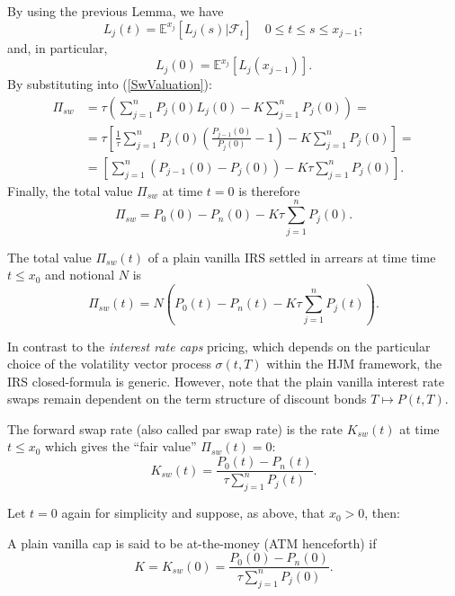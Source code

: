 By using the previous Lemma, we have 
$$
L_j(t)=\mathbb{E}^{x_j} \left[ L_j(s)\big| \mathcal{F}_t\right]\quad 0\leq
t\leq s\leq x_{j-1};
$$
and, in particular,
$$
L_j(0)=\mathbb{E}^{x_j} \left[ L_j(x_{j-1})\right].
$$
By substituting into (\ref{SwValuation}):
\begin{equation}
\label{SwValuationInter}
\begin{split}
\Pi_{sw} &=\tau \left(\sum_{j=1}^n P_j(0) L_j(0)-K\sum_{j=1}^n P_j(0)
\right)=\\ 
&=\tau \left[\frac{1}{\tau}\sum_{j=1}^n P_j(0)
  \left(\frac{P_{j-1}(0)}{P_j(0)}-1\right)-K\sum_{j=1}^n P_j(0)
\right]= \\
&=\left[\sum_{j=1}^n \left(P_{j-1}(0)-
    P_j(0)\right)-K\tau\sum_{j=1}^n P_j(0) \right].
\end{split}
\end{equation}
Finally, the total value $\Pi_{sw}$ at time $t=0$ is therefore
\begin{equation}
  \label{SwValuationFinal}
\Pi_{sw}=P_0(0)-P_n(0)-K\tau\sum_{j=1}^n P_j(0).
\end{equation}
\begin{propos}
The total value $\Pi_{sw}(t)$ of a plain vanilla IRS settled in
arrears at time time $t\leq x_0$ and notional $N$ is
\begin{equation}
\label{SwValutaionFinalGral}
\Pi_{sw}(t)=N\left(P_0(t)-P_n(t)-K\tau\sum_{j=1}^n P_j(t)\right).
\end{equation}
\end{propos}

In contrast to the \emph{interest rate caps} pricing, which depends on
the particular choice of the volatility vector process $\sigma(t,T)$ 
within the HJM framework, the IRS closed-formula is generic. However,
note that the plain vanilla interest rate swaps remain dependent on
the term structure of discount bonds $T \mapsto P(t,T)$.
\begin{defn}
The forward swap rate (also called par swap rate) is the rate
$K_{sw}(t)$ at time $t\leq x_0$ which gives the ``fair value''
$\Pi_{sw}(t)=0$:  
$$
K_{sw}(t)=\frac{P_0(t)-P_n(t)}{\tau \sum_{j=1}^n P_j(t)}.
$$
\end{defn}
Let $t=0$ again for simplicity and suppose, as above, that $x_0>0$,
then: 
\begin{rmk}
 A plain vanilla cap is said to be at-the-money (ATM henceforth) if 
\begin{equation}
\label{ATMStrikeCap}
K=K_{sw}(0)= \frac{P_0(0)-P_n(0)}{\tau\displaystyle \sum_{j=1}^n P_j(0)}.
\end{equation}
\end{rmk}
